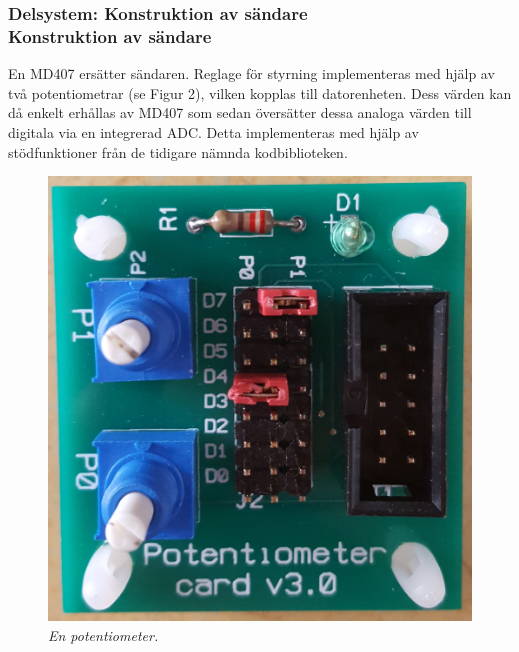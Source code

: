 \documentclass[a4paper]{article}
\begin{document}
\subsubsection{Delsystem: Konstruktion av sändare \\ Konstruktion av sändare}
En MD407 ersätter sändaren. Reglage för styrning implementeras med hjälp av två potentiometrar (se Figur 2), vilken kopplas till datorenheten. Dess värden kan då enkelt erhållas av MD407 som sedan översätter dessa analoga värden till digitala via en integrerad ADC. Detta implementeras med hjälp av stödfunktioner från de tidigare nämnda kodbiblioteken.

\begin{figure}[H]
\includegraphics[scale=0.04]{Potentiometer.jpg}
\centering
\caption{\it En potentiometer.}
\end{figure} 



\end{document}
